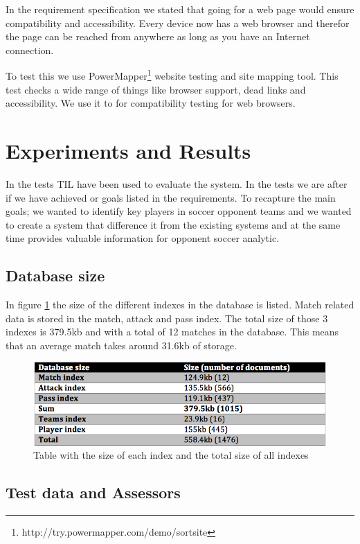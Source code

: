 In the requirement specification we stated that going for a web page would ensure compatibility and accessibility. Every device now has a web browser and therefor the page can be reached from anywhere as long as you have an Internet connection. 

To test this we use PowerMapper\footnote{ http://try.powermapper.com/demo/sortsite } website testing and site mapping tool. This test checks a wide range of things like browser support, dead links and accessibility. We use it to for compatibility testing for web browsers.

\section{Experiments and Results}

In the tests \ac{TIL} have been used to evaluate the system. In the tests we are after if we have achieved or goals listed in the requirements. To recapture the main goals; we wanted to identify key players in soccer opponent teams and we wanted to create a system that difference it from the existing systems and at the same time provides valuable information for opponent soccer analytic. 

\subsection{Database size}
In figure \ref{fig:dbsize} the size of the different indexes in the database is listed. Match related data is stored in the match, attack and pass index. The total size of those 3 indexes is 379.5kb and with a total of 12 matches in the database. This means that an average match takes around 31.6kb of storage.

\begin{figure}[ht!]
\centering
\includegraphics[width=1\textwidth]{images/evaluation/dbsize}
\caption{Table with the size of each index and the total size of all indexes}
\label{fig:dbsize}
\end{figure}

\subsection{Test data and Assessors}

